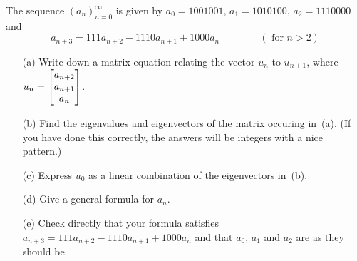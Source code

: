 \documentclass[a4paper]{amsart}
\begin{document}
\begin{exercise}\label{ex-diffeq-ii}
 The sequence $(a_n)_{n=0}^\infty$ is given by 
 $a_0=1001001$, $a_1=1010100$, $a_2=1110000$ and 
 \[ a_{n+3} = 111 a_{n+2} - 1110 a_{n+1} + 1000 a_n
   \hspace{4em} (\text{ for } n>2)
 \] 
 \begin{itemize}
  \item[(a)] Write down a matrix equation relating the vector $u_n$ to
   $u_{n+1}$, where $u_n=\left[\begin{matrix} a_{n+2}\\ a_{n+1}\\ a_n\end{matrix}\right]$.
  \item[(b)] Find the eigenvalues and eigenvectors of the matrix
   occuring in~(a).  (If you have done this correctly, the answers
   will be integers with a nice pattern.)
  \item[(c)] Express $u_0$ as a linear combination of the eigenvectors
   in~(b).
  \item[(d)] Give a general formula for $a_n$.
  \item[(e)] Check directly that your formula satisfies
   $a_{n+3}=111a_{n+2}-1110 a_{n+1}+1000a_n$ and that $a_0$, $a_1$ and
   $a_2$ are as they should be.
 \end{itemize}
\end{exercise}
\end{document}
